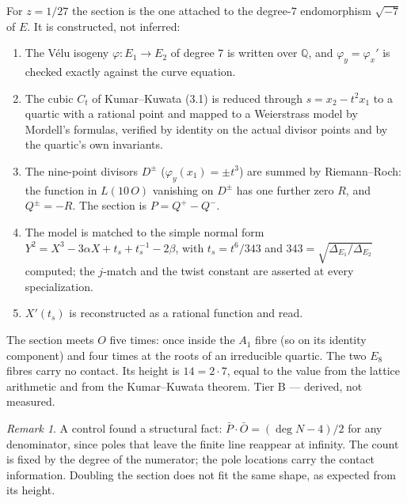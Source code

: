 \documentclass[11pt,a4paper]{article}
\theoremstyle{remark}
\newtheorem{remark}{Remark}[section]
\newcommand{\tierB}{\colorbox{yellow!20}{\textsf{\scriptsize Tier B --- derived, not measured}}}
\begin{document}
For $z=1/27$ the section is the one attached to the degree-$7$ endomorphism $\sqrt{-7}$ of $E$. It is constructed, not inferred:
\begin{enumerate}
\item The V\'elu isogeny $\varphi\colon E_1\to E_2$ of degree $7$ is written over $\mathbb{Q}$, and $\varphi_y=\varphi_x'$ is checked
  exactly against the curve equation.
\item The cubic $C_t$ of Kumar--Kuwata (3.1) is reduced through $s=x_2-t^2x_1$ to a quartic with a rational point and mapped to a
  Weierstrass model by Mordell's formulas, verified by identity on the actual divisor points and by the quartic's own invariants.
\item The nine-point divisors $D^{\pm}$ ($\varphi_y(x_1)=\pm t^3$) are summed by Riemann--Roch: the function in $L(10\,O)$ vanishing on
  $D^{\pm}$ has one further zero $R$, and $Q^{\pm}=-R$. The section is $P=Q^{+}-Q^{-}$.
\item The model is matched to the simple normal form $Y^2=X^3-3\alpha X+t_s+t_s^{-1}-2\beta$, with $t_s=t^6/343$ and
  $343=\sqrt{\Delta_{E_1}/\Delta_{E_2}}$ computed; the $j$-match and the twist constant are asserted at every specialization.
\item $X'(t_s)$ is reconstructed as a rational function and read.
\end{enumerate}

\begin{table}[h]
\centering\small

\caption{The reconstruction and what is read from it. The cross-check row compares with the lattice steps and the fibration
certificate, each read from its own file.}\label{tab:descent}
\end{table}

\begin{headlinebox}
The section meets $O$ five times: once inside the $A_1$ fibre (so on its identity component) and four times at the roots of an
irreducible quartic. The two $E_8$ fibres carry no contact. Its height is $14=2\cdot7$, equal to the value from the lattice arithmetic
and from the Kumar--Kuwata theorem. \tierB.
\end{headlinebox}

\begin{remark}
A control found a structural fact: $\bar P\cdot\bar O=(\deg N-4)/2$ for any denominator, since poles that leave the finite line
reappear at infinity. The count is fixed by the degree of the numerator; the pole locations carry the contact information. Doubling
the section does not fit the same shape, as expected from its height.
\end{remark}
\end{document}
